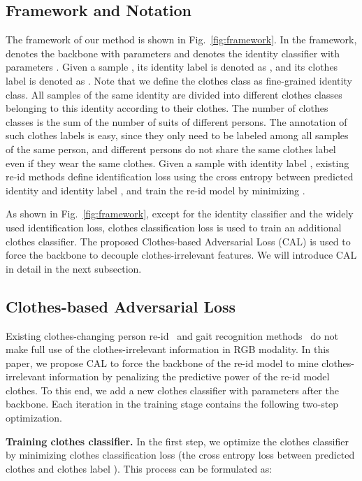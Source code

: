 \documentclass[10pt,twocolumn,letterpaper]{article}
\begin{document}
\subsection{Framework and Notation}
The framework of our method is shown in Fig.~\ref{fig:framework}.
In the framework,  denotes the backbone with parameters  and  denotes the identity classifier with parameters .
Given a sample , its identity label is denoted as , and its clothes label is denoted as .
Note that we define the clothes class as fine-grained identity class.
All samples of the same identity are divided into different clothes classes belonging to this identity according to their clothes.
The number of clothes classes is the sum of the number of suits of different persons.
The annotation of such clothes labels is easy, since they only need to be labeled among all samples of the same person, and different persons do not share the same clothes label even if they wear the same clothes.
Given a sample  with identity label , existing re-id methods \cite{Sun2018Beyond, Hou2019Interaction} define identification loss  using the cross entropy between predicted identity  and identity label , and train the re-id model by minimizing .

As shown in Fig.~\ref{fig:framework}, except for the identity classifier and the widely used identification loss, clothes classification loss  is used to train an additional clothes classifier.
The proposed Clothes-based Adversarial Loss (CAL)  is used to force the backbone to decouple clothes-irrelevant features.
We will introduce CAL in detail in the next subsection.

\subsection{Clothes-based Adversarial Loss}
\label{sec:CAL}
Existing clothes-changing person re-id~\cite{Yang2019PRCC, Qian2020LTCC} and gait recognition methods~\cite{Yang2016Learning, Chao2019Gaitset} do not make full use of the clothes-irrelevant information in RGB modality.
In this paper, we propose CAL to force the backbone of the re-id model to mine clothes-irrelevant information by penalizing the predictive power of the re-id model \wrt clothes.
To this end, we add a new clothes classifier  with parameters  after the backbone. Each iteration in the training stage contains the following two-step optimization.

\medskip
\noindent
\textbf{Training clothes classifier.} In the first step, we optimize the clothes classifier by minimizing clothes classification loss  (the cross entropy loss between predicted clothes  and clothes label ).
This process can be formulated as:
\end{document}
